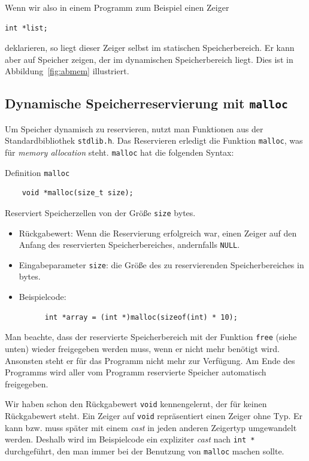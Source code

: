 Wenn wir also in einem Programm zum Beispiel einen Zeiger
\begin{lstlisting}
int *list;
\end{lstlisting}
deklarieren, so liegt dieser Zeiger selbst im statischen Speicherbereich.
Er kann aber auf Speicher zeigen, der im dynamischen Speicherbereich liegt.
Dies ist in Abbildung~\ref{fig:abmem} illustriert.

\subsection{Dynamische Speicherreservierung mit \texttt{malloc}}

Um Speicher dynamisch zu reservieren, nutzt man Funktionen aus der Standardbibliothek \verb|stdlib.h|.
Das Reservieren erledigt die Funktion \verb|malloc|, was für \emph{memory allocation} steht.
\verb|malloc| hat die folgenden Syntax:
\begin{mydefinitionblock}{Definition \texttt{malloc}}
  \begin{lstlisting}
    void *malloc(size_t size);
  \end{lstlisting}
  Reserviert Speicherzellen von der Größe \verb|size| bytes.
  \begin{itemize} 
    \itemsep0.2pt
  \item Rückgabewert: Wenn die Reservierung erfolgreich war, einen Zeiger auf den Anfang des
    reservierten Speicherbereiches, andernfalls \verb|NULL|.
  \item Eingabeparameter \verb|size|: die Größe des zu reservierenden Speicherbereiches in bytes.
  \item Beispielcode:
    \begin{lstlisting}
      int *array = (int *)malloc(sizeof(int) * 10);
    \end{lstlisting}
  \end{itemize}
  Man beachte, dass der reservierte Speicherbereich mit der Funktion \verb|free| (siehe unten) wieder freigegeben werden muss, wenn er nicht mehr benötigt wird. 
  Ansonsten steht er für das Programm nicht mehr zur Verfügung.
  Am Ende des Programms wird aller vom Programm reservierte Speicher automatisch freigegeben.
\end{mydefinitionblock}
Wir haben schon den Rückgabewert \verb|void| kennengelernt, der für keinen Rückgabewert steht.
Ein Zeiger auf \verb|void| repräsentiert einen Zeiger ohne Typ.
Er kann bzw. muss später mit einem \emph{cast} in jeden anderen Zeigertyp umgewandelt werden.
Deshalb wird im Beispielcode ein expliziter \emph{cast} nach \verb|int *| durchgeführt, den man immer bei der Benutzung von \verb|malloc| machen sollte.

